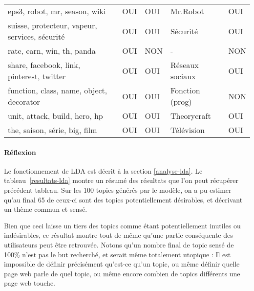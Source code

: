 \begin{longtable}{lllll}
\scriptsize eps3, robot, mr, season, wiki                      & \cellcolor[HTML]{9AFF99}OUI & \cellcolor[HTML]{9AFF99}OUI & Mr.Robot                  & \cellcolor[HTML]{9AFF99}OUI \\
\scriptsize suisse, protecteur, vapeur, services, sécurité     & \cellcolor[HTML]{9AFF99}OUI & \cellcolor[HTML]{9AFF99}OUI & Sécurité                  & \cellcolor[HTML]{9AFF99}OUI \\
\scriptsize rate, earn, win, th, panda                         & \cellcolor[HTML]{9AFF99}OUI & \cellcolor[HTML]{FFCCC9}NON & -                         & \cellcolor[HTML]{FFCCC9}NON \\
\scriptsize share, facebook, link, pinterest, twitter          & \cellcolor[HTML]{9AFF99}OUI & \cellcolor[HTML]{9AFF99}OUI & Réseaux sociaux           & \cellcolor[HTML]{9AFF99}OUI \\
\scriptsize function, class, name, object, decorator           & \cellcolor[HTML]{9AFF99}OUI & \cellcolor[HTML]{9AFF99}OUI & Fonction (prog)           & \cellcolor[HTML]{FFCCC9}NON \\
\scriptsize unit, attack, build, hero, hp                      & \cellcolor[HTML]{9AFF99}OUI & \cellcolor[HTML]{9AFF99}OUI & Theorycraft               & \cellcolor[HTML]{9AFF99}OUI \\
\scriptsize the, saison, série, big, film                      & \cellcolor[HTML]{9AFF99}OUI & \cellcolor[HTML]{9AFF99}OUI & Télévision                & \cellcolor[HTML]{9AFF99}OUI
\end{longtable}

			\paragraph{Réflexion}

				Le fonctionnement de LDA est décrit à la section \ref{analyse-lda}. Le tableau~\ref{resultats-lda} montre un résumé des résultats que l'on peut récupérer précédent tableau. Sur les 100 topics générés par le modèle, on a pu estimer qu'au final 65 de ceux-ci sont des topics potentiellement désirables, et décrivant un thème commun et sensé.

				Bien que ceci laisse un tiers des topics comme étant potentiellement inutiles ou indésirables, ce résultat montre tout de même qu'une partie conséquente des utilisateurs peut être retrouvée. Notons qu'un nombre final de topic sensé de 100\% n'est pas le but recherché, et serait même totalement utopique : Il est impossible de définir précisément qu'est-ce qu'un topic, ou même définir quelle page web parle de quel topic, ou même encore combien de topics différents une page web touche.

